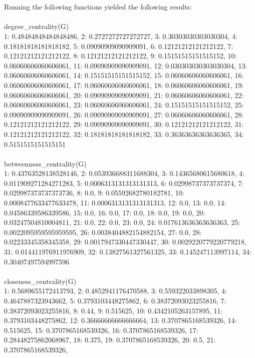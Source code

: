 \documentclass[11pt]{article}
\begin{document}
\section{}
Running the following functions yielded the following results:\\
\\
degree\_centrality(G)\\
1: 0.48484848484848486, 2: 0.2727272727272727, 3: 0.30303030303030304,
4: 0.18181818181818182, 5: 0.09090909090909091, 6: 0.12121212121212122,
7: 0.12121212121212122, 8: 0.12121212121212122, 9: 0.15151515151515152,
10: 0.06060606060606061, 11: 0.09090909090909091, 12: 0.030303030303030304,
13: 0.06060606060606061, 14: 0.15151515151515152, 15: 0.06060606060606061,
16: 0.06060606060606061, 17: 0.06060606060606061, 18: 0.06060606060606061,
19: 0.06060606060606061, 20: 0.09090909090909091, 21: 0.06060606060606061,
22: 0.06060606060606061, 23: 0.06060606060606061, 24: 0.15151515151515152,
25: 0.09090909090909091, 26: 0.09090909090909091, 27: 0.06060606060606061,
28: 0.12121212121212122, 29: 0.09090909090909091, 30: 0.12121212121212122,
31: 0.12121212121212122, 32: 0.18181818181818182, 33: 0.36363636363636365,
34: 0.5151515151515151
\\\\
betweenness\_centrality(G)\\
1: 0.43763528138528146, 2: 0.053936688311688304, 3: 0.14365680615680618,
4: 0.011909271284271283, 5: 0.0006313131313131313, 6: 0.02998737373737374,
7: 0.029987373737373736, 8: 0.0, 9: 0.05592682780182781, 10: 0.0008477633477633478,
11: 0.0006313131313131313, 12: 0.0, 13: 0.0, 14: 0.04586339586339586, 15: 0.0,
16: 0.0, 17: 0.0, 18: 0.0, 19: 0.0, 20: 0.03247504810004811, 21: 0.0, 22: 0.0,
23: 0.0, 24: 0.017613636363636363, 25: 0.0022095959595959595, 26: 0.0038404882154882154,
27: 0.0, 28: 0.02233345358345358, 29: 0.0017947330447330447, 30: 0.0029220779220779218,
31: 0.014411976911976909, 32: 0.13827561327561325, 33: 0.145247113997114, 34: 0.30407497594997596
\\\\
closeness\_centrality(G)\\
1: 0.5689655172413793, 2: 0.4852941176470588, 3: 0.559322033898305,
4: 0.4647887323943662, 5: 0.3793103448275862, 6: 0.38372093023255816,
7: 0.38372093023255816, 8: 0.44, 9: 0.515625, 10: 0.4342105263157895,
11: 0.3793103448275862, 12: 0.36666666666666664, 13: 0.3707865168539326,
14: 0.515625, 15: 0.3707865168539326, 16: 0.3707865168539326, 17: 0.28448275862068967,
18: 0.375, 19: 0.3707865168539326, 20: 0.5, 21: 0.3707865168539326,
\end{document}
